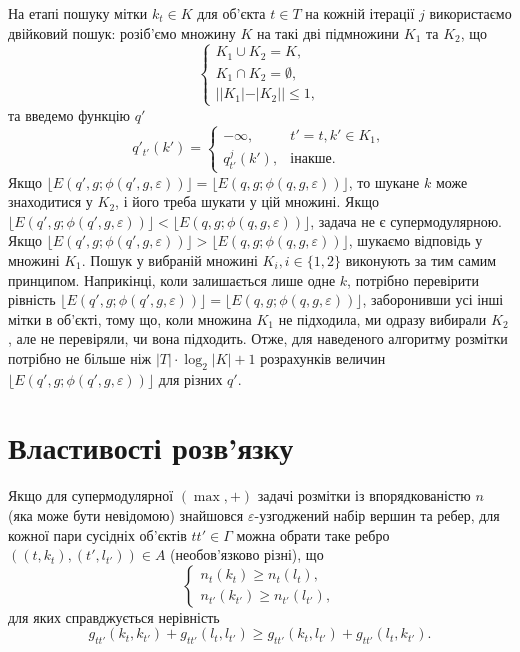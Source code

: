 На етапі пошуку мітки $k_t\in K$ для об'єкта $t\in T$ на кожній ітерації $j$
використаємо двійковий пошук: розіб'ємо множину $K$ на такі дві підмножини $K_1$ та $K_2$, що
\begin{equation}
    \begin{cases}
        K_1\cup K_2 = K, \\
        K_1\cap K_2 = \emptyset, \\
        ||K_1|-|K_2|| \leq 1,
    \end{cases}
\end{equation}
та введемо функцію $q'$
\begin{equation}
    q'_{t'}(k') =
    \begin{cases}
        -\infty, & t'=t, k' \in  K_1,\\
        q^j_{t'}(k'), & \text{інакше.}
    \end{cases}
\end{equation}
Якщо $\lfloor E(q',g;\phi(q',g,\varepsilon))\rfloor = \lfloor E(q,g;\phi(q,g,\varepsilon))\rfloor$, то шукане $k$ 
може знаходитися у $K_2$, і його треба шукати у цій множині. Якщо 
$\lfloor E(q',g;\phi(q',g,\varepsilon))\rfloor < \lfloor E(q,g;\phi(q,g,\varepsilon))\rfloor$, задача не є супермодулярною.
Якщо $\lfloor E(q',g;\phi(q',g,\varepsilon))\rfloor > \lfloor E(q,g;\phi(q,g,\varepsilon))\rfloor$, шукаємо відповідь у множині $K_1$.
Пошук у вибраній множині $K_i, i\in \{1,2\}$ виконують за тим самим принципом.
Наприкінці, коли залишається лише одне $k$, потрібно перевірити рівність 
$\lfloor E(q',g;\phi(q',g,\varepsilon))\rfloor = \lfloor E(q,g;\phi(q,g,\varepsilon))\rfloor$, 
заборонивши усі інші мітки в об'єкті, тому що, коли множина $K_1$ не підходила, ми 
одразу вибирали $K_2$, але не перевіряли, чи вона підходить. 
Отже, для наведеного алгоритму розмітки потрібно не більше ніж $|T|\cdot \log_2 |K| + 1$ 
розрахунків величин $\lfloor E(q',g;\phi(q',g,\varepsilon))\rfloor$ для різних $q'$.

\section{Властивості розв'язку}

Якщо для супермодулярної $(\max,+)$ задачі розмітки із впорядкованістю $n$ 
(яка може бути невідомою) знайшовся $\varepsilon$-узгоджений набір вершин та ребер, 
для кожної пари сусідніх об'єктів $tt'\in\Gamma$ можна обрати таке ребро 
$((t,k_t),(t',l_{t'}))\in A$ (необов'язково різні), що 
\begin{equation}
    \begin{cases}
        n_t(k_t)\geq n_t(l_t),\\
        n_{t'}(k_{t'})\geq n_{t'}(l_{t'}),
    \end{cases}
\end{equation}
для яких справджується нерівність 
\begin{equation}
    g_{tt'}(k_t,k_{t'})+g_{tt'}(l_t,l_{t'})\geq g_{tt'}(k_t,l_{t'})+g_{tt'}(l_t,k_{t'}).
\end{equation}

